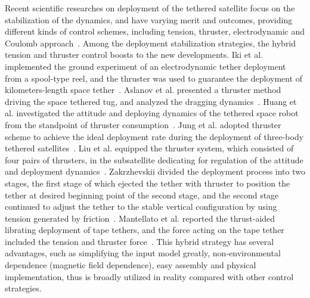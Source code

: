 \documentclass[Journal,letterpaper]{ascelike-new}
\theoremstyle{plain}
\theoremstyle{remark}
\begin{document}
Recent scientific researches on deployment of the tethered satellite focus on the stabilization of the dynamics, and have varying merit and outcomes, providing different kinds of control schemes, including tension, thruster, electrodynamic and Coulomb approach~\cite{kojima2015stabilisation,qi2016dynamics,zhong2016research}. Among the deployment stabilization strategies, the hybrid tension and thruster control boosts to the new developments. Iki et al. implemented the ground experiment of an electrodynamic tether deployment from a spool-type reel, and the thruster was used to guarantee the deployment of kilometers-length space tether~\cite{iki2014experiments}. Aslanov et al. presented a thruster method driving the space tethered tug, and analyzed the dragging dynamics~\cite{aslanov2013dynamics}. Huang et al. investigated the attitude and deploying dynamics of the tethered space robot from the standpoint of thruster consumption~\cite{huang2015coupling}. Jung et al. adopted thruster scheme to achieve the ideal deployment rate during the deployment of three-body tethered satellites~\cite{jung2015nonlinear}. Liu et al. equipped the thruster system, which consisted of four pairs of thrusters, in the subsatellite dedicating for regulation of the attitude and deployment dynamics~\cite{liu2014attitude}. Zakrzhevskii divided the deployment process into two stages, the first stage of which ejected the tether with thruster to position the tether at desired beginning point of the second stage, and the second stage continued to adjust the tether to the stable vertical configuration by using tension generated by friction~\cite{zakrzhevskii2016method}. Mantellato et al. reported the thrust-aided librating deployment of tape tethers, and the force acting on the tape tether included the tension and thruster force~\cite{mantellato2015thrust}. This hybrid strategy has several advantages, such as simplifying the input model greatly, non-environmental dependence (magnetic field dependence), easy assembly and physical implementation, thus is broadly utilized in reality compared with other control strategies.\par
\end{document}

